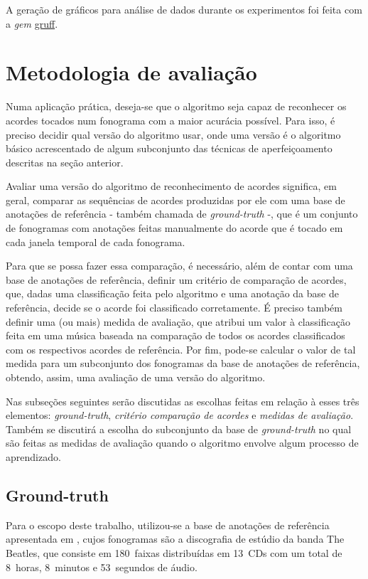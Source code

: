    A geração de gráficos para análise de dados durante os experimentos foi feita com a \textit{gem} \href{https://github.com/topfunky/gruff}{gruff}.

\section{Metodologia de avaliação}
    Numa aplicação prática, deseja-se que o algoritmo seja capaz de reconhecer os acordes tocados num fonograma com a maior acurácia possível. Para isso, é preciso decidir qual versão do algoritmo usar, onde uma versão é o algoritmo básico acrescentado de algum subconjunto das técnicas de aperfeiçoamento descritas na seção anterior.
    
    Avaliar uma versão do algoritmo de reconhecimento de acordes significa, em geral, comparar as sequências de acordes produzidas por ele com uma base de anotações de referência - também chamada de \textit{ground-truth} -, que é um conjunto de fonogramas com anotações feitas manualmente do acorde que é tocado em cada janela temporal de cada fonograma.
    
    Para que se possa fazer essa comparação, é necessário, além de contar com uma base de anotações de referência, definir um critério de comparação de acordes, que, dadas uma classificação feita pelo algoritmo e uma anotação da base de referência, decide se o acorde foi classificado corretamente. É preciso também definir uma (ou mais) medida de avaliação, que atribui um valor à classificação feita em uma música baseada na comparação de todos os acordes classificados com os respectivos acordes de referência. Por fim, pode-se calcular o valor de tal medida para um subconjunto dos fonogramas da base de anotações de referência, obtendo, assim, uma avaliação de uma versão do algoritmo.

    Nas subseções seguintes serão discutidas as escolhas feitas em relação à esses três elementos: \textit{ground-truth}, \textit{critério comparação de acordes} e \textit{medidas de avaliação}. Também se discutirá a escolha do subconjunto da base de \textit{ground-truth} no qual são feitas as medidas de avaliação quando o algoritmo envolve algum processo de aprendizado.
    
    \subsection{Ground-truth}
        Para o escopo deste trabalho, utilizou-se a base de anotações de referência apresentada em \cite{harte}, cujos fonogramas são a discografia de estúdio da banda The Beatles, que consiste em 180~faixas distribuídas em 13~CDs com um total de 8~horas, 8~minutos e 53~segundos de áudio.
        
